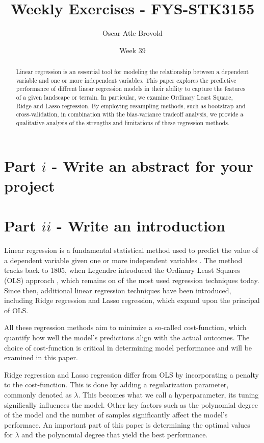 \documentclass{article}
\title{Weekly Exercises - FYS-STK3155}
\author{Oscar Atle Brovold}
\date{Week 39}
\begin{document}
\onehalfspacing
\maketitle

\section*{Part \(i\) - Write an abstract for your project} 
\begin{abstract}
   Linear regression is an essential tool for modeling the relationship between a dependent variable and
   one or more independent variables. This paper explores the predictive performance of diffrent linear regression models 
   in their ability to capture the features of a given landscape or terrain. 
   In particular, we examine Ordinary Least Square, Ridge and Lasso
   regression. By employing resampling methods, such as bootstrap and cross-validation, in combination with the bias-variance
   tradeoff analysis, we provide a qualitative analysis of the strengths and limitations of these regression methods.
\end{abstract}

\section*{Part \(ii\) - Write an introduction} 

Linear regression is a fundamental statistical method used to predict the value of a dependent variable given one or more independent variables \cite{cite1}.
The method tracks back to 1805, when Legendre introduced the Ordinary Least Squares (OLS) approach \cite{cite2}, which remains on of the most used regression techniques today.
Since then, additional linear regression techniques have been introduced, including Ridge regression and Lasso regression,
which expand upon the principal of OLS. 

All these regression methods aim to minimize a so-called cost-function, which quantify how well the model's
predictions align with the actual outcomes. The choice of cost-function is critical in determining model performance and 
will be examined in this paper. 

Ridge regression and Lasso regression differ from OLS by incorporating a penalty to the cost-function. This is done 
by adding a regularization parameter, commonly denoted as $\lambda$. This becomes what we call a hyperparameter, its tuning significally
influences the model. Other key factors such as the polynomial degree of the model and the number of samples significantly affect the model's performace.
An important part of this paper is determining the optimal values for $\lambda$ and the polynomial degree that 
yield the best performance. 
\end{document}
